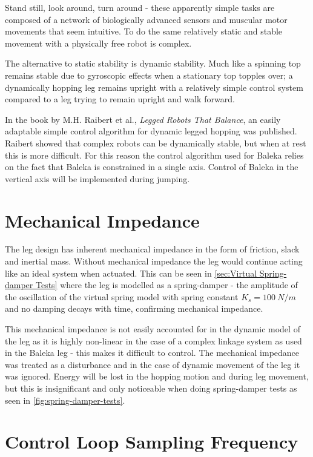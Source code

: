 Stand still, look around, turn around - these apparently simple tasks are composed of a network of biologically advanced sensors and muscular motor movements that seem intuitive. To do the same relatively static and stable movement with a physically free robot is complex. 

The alternative to static stability is dynamic stability. Much like a spinning top remains stable due to gyroscopic effects when a stationary top topples over; a dynamically hopping leg remains upright with a relatively simple control system compared to a leg trying to remain upright and walk forward.

In the book by  M.H. Raibert et al., \textit{Legged Robots That Balance}, an easily adaptable simple control algorithm for dynamic legged hopping was published. Raibert showed that complex robots can be dynamically stable, but when at rest this is more difficult. For this reason the control algorithm used for Baleka relies on the fact that Baleka is constrained in a single axis. Control of Baleka in the vertical axis will be implemented during jumping.

\section{Mechanical Impedance}
The leg design has inherent mechanical impedance in the form of friction, slack and inertial mass. Without mechanical impedance the leg would continue acting like an ideal system when actuated. This can be seen in \cref{sec:Virtual Spring-damper Tests} where the leg is modelled as a spring-damper - the amplitude of the oscillation of the virtual spring model with spring constant $K_s = 100\ N/m$ and no damping decays with time, confirming mechanical impedance. 

This mechanical impedance is not easily accounted for in the dynamic model of the leg as it is highly non-linear in the case of a complex linkage system as used in the Baleka leg - this makes it difficult to control. The mechanical impedance was treated as a disturbance and in the case of dynamic movement of the leg it was ignored. Energy will be lost in the hopping motion and during leg movement, but this is insignificant and only noticeable when doing spring-damper tests as seen in \cref{fig:spring-damper-tests}.

\section{Control Loop Sampling Frequency}

